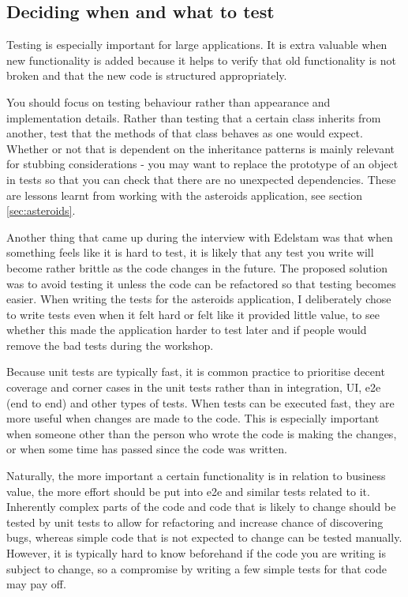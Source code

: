 \documentclass[11pt]{article}
\begin{document}
\subsection{Deciding when and what to test}

Testing is especially important for large applications. It is extra valuable when new functionality is added because it helps to verify that old functionality is not broken and that the new code is structured appropriately. \cite[questions~6-7]{Stenmark}

You should focus on testing behaviour rather than appearance and implementation details. \cite[question~10]{Edelstam} Rather than testing that a certain class inherits from another, test that the methods of that class behaves as one would expect. Whether or not that is dependent on the inheritance patterns is mainly relevant for stubbing considerations - you may want to replace the prototype of an object in tests so that you can check that there are no unexpected dependencies. These are lessons learnt from working with the asteroids application, see section \ref{sec:asteroids}. 

Another thing that came up during the interview with Edelstam was that when something feels like it is hard to test, it is likely that any test you write will become rather brittle as the code changes in the future. The proposed solution was to avoid testing it unless the code can be refactored so that testing becomes easier. \cite[question~30]{Edelstam} When writing the tests for the asteroids application, I deliberately chose to write tests even when it felt hard or felt like it provided little value, to see whether this made the application harder to test later and if people would remove the bad tests during the workshop.

Because unit tests are typically fast, it is common practice to prioritise decent coverage and corner cases in the unit tests rather than in integration, UI, e2e (end to end) and other types of tests. When tests can be executed fast, they are more useful when changes are made to the code. This is especially important when someone other than the person who wrote the code is making the changes, or when some time has passed since the code was written. \cite[questions~22-24]{Stenmark}

Naturally, the more important a certain functionality is in relation to business value, the more effort should be put into e2e and similar tests related to it. Inherently complex parts of the code and code that is likely to change should be tested by unit tests to allow for refactoring and increase chance of discovering bugs, whereas simple code that is not expected to change can be tested manually. However, it is typically hard to know beforehand if the code you are writing is subject to change, so a compromise by writing a few simple tests for that code may pay off. \cite[questions~28-29 and 33]{Stenmark}
\end{document}
